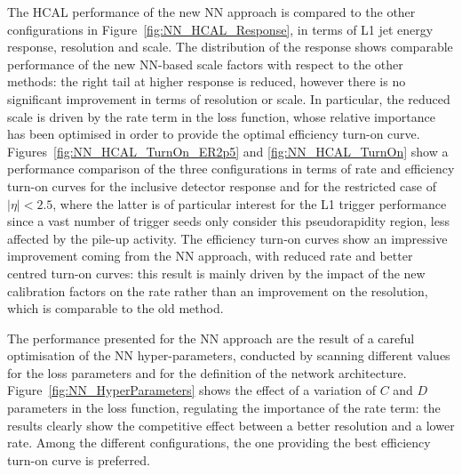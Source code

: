 The HCAL performance of the new NN approach is compared to the other configurations in Figure~\ref{fig:NN_HCAL_Response}, in terms of L1 jet energy response, resolution and scale. The distribution of the response shows comparable performance of the new NN-based scale factors with respect to the other methods: the right tail at higher response is reduced, however there is no significant improvement in terms of resolution or scale. In particular, the reduced scale is driven by the rate term in the loss function, whose relative importance has been optimised in order to provide the optimal efficiency turn-on curve. Figures~\ref{fig:NN_HCAL_TurnOn_ER2p5} and \ref{fig:NN_HCAL_TurnOn} show a performance comparison of the three configurations in terms of rate and efficiency turn-on curves for the inclusive detector response and for the restricted case of $|\eta|<2.5$, where the latter is of particular interest for the L1 trigger performance since a vast number of trigger seeds only consider this pseudorapidity region, less affected by the pile-up activity.
The efficiency turn-on curves show an impressive improvement coming from the NN approach, with reduced rate and better centred turn-on curves: this result is mainly driven by the impact of the new calibration factors on the rate rather than an improvement on the resolution, which is comparable to the old method.

\bigbreak

The performance presented for the NN approach are the result of a careful optimisation of the NN hyper-parameters, conducted by scanning different values for the loss parameters and for the definition of the network architecture. Figure~\ref{fig:NN_HyperParameters} shows the effect of a variation of $C$ and $D$ parameters in the loss function, regulating the importance of the rate term: the results clearly show the competitive effect between a better resolution and a lower rate. Among the different configurations, the one providing the best efficiency turn-on curve is preferred.

